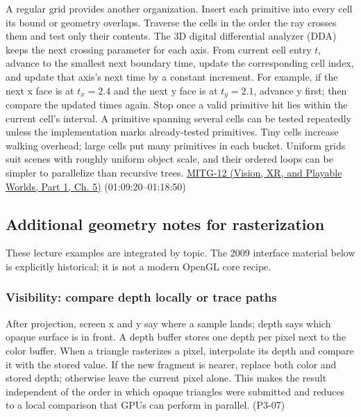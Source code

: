 A regular grid provides another organization. Insert each primitive into every cell its bound or geometry overlaps. Traverse the cells in the order the ray crosses them and test only their contents. The 3D digital differential analyzer (DDA) keeps the next crossing parameter for each axis. From current cell entry \(t\), advance to the smallest next boundary time, update the corresponding cell index, and update that axis's next time by a constant increment. For example, if the next x face is at \(t_x=2.4\) and the next y face is at \(t_y=2.1\), advance y first; then compare the updated times again. Stop once a valid primitive hit lies within the current cell's interval. A primitive spanning several cells can be tested repeatedly unless the implementation marks already-tested primitives. Tiny cells increase walking overhead; large cells put many primitives in each bucket. Uniform grids suit scenes with roughly uniform object scale, and their ordered loops can be simpler to parallelize than recursive trees. \href{../07-Vision-XR-and-Playable-Worlds-P01/main.pdf\#nameddest=04-visual-computing-ii-ch036-mitg-12---ray-tracing-ii}{MITG-12 (Vision, XR, and Playable Worlds, Part 1, Ch. 5)} (01:09:20--01:18:50)

\subsection{Additional geometry notes for rasterization}\label{04-visual-computing-ii-ch029-additional-geometry-notes-for-rasterization}

\hypertarget{04-visual-computing-ii-ch029-additional-geometry-notes-for-rasterization}{}

These lecture examples are integrated by topic. The 2009 interface material below is explicitly historical; it is not a modern OpenGL core recipe.

\subsubsection{Visibility: compare depth locally or trace paths}\label{04-visual-computing-ii-ch029-visibility-compare-depth-locally-or-trace-paths}

\hypertarget{04-visual-computing-ii-ch029-visibility-compare-depth-locally-or-trace-paths}{}

After projection, screen x and y say where a sample lands; depth says which opaque surface is in front. A depth buffer stores one depth per pixel next to the color buffer. When a triangle rasterizes a pixel, interpolate its depth and compare it with the stored value. If the new fragment is nearer, replace both color and stored depth; otherwise leave the current pixel alone. This makes the result independent of the order in which opaque triangles were submitted and reduces to a local comparison that GPUs can perform in parallel. (P3-07)

